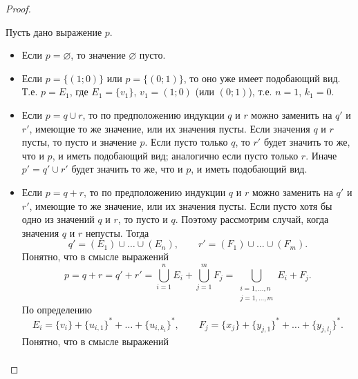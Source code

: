 \documentclass[12pt,a4paper]{article}
\begin{document}
\begin{problem}{8}
\begin{enumerate}
\begin{proof}
\begin{enumerate}
                            Пусть дано выражение $p$.
                            \begin{itemize}
                                \item Если $p = \varnothing$, то значение $\varnothing$ пусто.
                                \item Если $p = \{(1; 0)\}$ или $p = \{(0; 1)\}$, то оно уже имеет подобающий вид. Т.е. $p = E_1$, где $E_1 = \{v_1\}$, $v_1 = (1; 0)$ (или $(0; 1)$), т.е. $n = 1$, $k_1 = 0$.
                                \item Если $p = q \cup r$, то по предположению индукции $q$ и $r$ можно заменить на $q'$ и $r'$, имеющие то же значение, или их значения пусты. Если значения $q$ и $r$ пусты, то пусто и значение $p$. Если пусто только $q$, то $r'$ будет значить то же, что и $p$, и иметь подобающий вид; аналогично если пусто только $r$. Иначе $p' = q' \cup r'$ будет значить то же, что и $p$, и иметь подобающий вид.
                                \item Если $p = q + r$, то по предположению индукции $q$ и $r$ можно заменить на $q'$ и $r'$, имеющие то же значение, или их значения пусты. Если пусто хотя бы одно из значений $q$ и $r$, то пусто и $q$. Поэтому рассмотрим случай, когда значения $q$ и $r$ непусты. Тогда
                                    \[
                                        q' = (E_1) \cup \dots \cup (E_n),
                                        \qquad
                                        r' = (F_1) \cup \dots \cup (F_m).
                                    \]
                                    Понятно, что в смысле выражений
                                    \[
                                        p
                                        = q + r
                                        = q' + r'
                                        = \bigcup_{i=1}^n E_i + \bigcup_{j=1}^m F_j
                                        = \bigcup_{\substack{i=1,\dots,n\\ j=1,\dots,m}} E_i + F_j.
                                    \]
                                    По определению
                                    \[
                                        E_i = \{v_i\} + \{u_{i, 1}\}^* + \dots + \{u_{i, k_i}\}^*,
                                        \qquad
                                        F_j = \{x_j\} + \{y_{j, 1}\}^* + \dots + \{y_{j, l_j}\}^*.
                                    \]
                                    Понятно, что в смысле выражений
                                    \begin{align*}

\end{align*}
\end{itemize}
\end{enumerate}
\end{proof}
\end{enumerate}
\end{problem}
\end{document}
